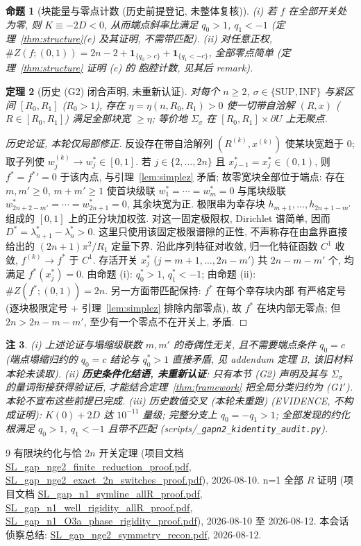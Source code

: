 \documentclass[UTF8]{ctexart}
\newtheorem{theorem}{定理}[section]
\newtheorem{proposition}[theorem]{命题}
\newtheorem{remark}[theorem]{注}
\begin{document}
\begin{proposition}[块能量与零点计数 (历史前提登记, 未整体复核)]
(i) 若 $f$ 在全部开关处为零, 则 $K\equiv-2D<0$, 从而端点斜率比满足
$q_0>1$, $q_1<-1$ (定理~\ref{thm:structure}(e) 及其证明, 不需带匹配).
(ii) 对任意正权, $\#Z(f;(0,1))=2n-2+\mathbf1_{\{q_0>c\}}
+\mathbf1_{\{q_1<-c\}}$, 全部零点简单 (定理~\ref{thm:structure} 证明 (c) 的
胞腔计数, 见其后 remark).
\end{proposition}

\begin{theorem}[历史 (G2) 闭合声明, 未重新认证]\label{thm:g2}
对每个 $n\ge2$, $\sigma\in\{\mathrm{SUP},\mathrm{INF}\}$ 与紧区间
$[R_0,R_1]$ ($R_0>1$), 存在 $\eta=\eta(n,R_0,R_1)>0$ 使一切带自洽解
$(R,x)$ ($R\in[R_0,R_1]$) 满足全部块宽 $\ge\eta$; 等价地 $\Sigma_\sigma$
在 $[R_0,R_1]\times\partial U$ 上无聚点.
\end{theorem}

\begin{proof}[历史论证, 本轮仅局部修正]
反设存在带自洽解列 $(R^{(k)},x^{(k)})$ 使某块宽趋于 $0$; 取子列使
$w_j^{(k)}\to w_j^*\in[0,1]$. 若 $j\in\{2,\dots,2n\}$ 且
$x_{j-1}^*=x_j^*\in(0,1)$, 则 $f^*=f^{*}{}'=0$ 于该内点, 与引理~\ref{lem:simplez}
矛盾; 故零宽块全部位于端点: 存在 $m,m'\ge0$, $m+m'\ge1$ 使首块级联
$w_1^*=\cdots=w_m^*=0$ 与尾块级联 $w_{2n+2-m'}^*=\cdots=w_{2n+1}^*=0$,
其余块宽为正. 极限串为幸存块 $h_{m+1},\dots,h_{2n+1-m'}$ 组成的
$[0,1]$ 上的正分块加权弦. 对这一固定极限权, Dirichlet 谱简单, 因而
$D^*=\lambda_{n+1}^*-\lambda_n^*>0$. 这里只使用该固定极限谱隙的正性,
不声称存在由盒界直接给出的 $(2n+1)\pi^2/R_1$ 定量下界.
沿此序列特征对收敛, 归一化特征函数 $C^1$ 收敛,
$f^{(k)}\to f^*$ 于 $C^1$. 存活开关 $x_j^*$ ($j=m+1,\dots,2n-m'$) 共
$2n-m-m'$ 个, 均满足 $f^*(x_j^*)=0$. 由命题 (i): $q_0^*>1$, $q_1^*<-1$;
由命题 (ii): $\#Z(f^*;(0,1))=2n$. 另一方面带匹配保持: $f^*$ 在每个幸存块内部
有严格定号 (逐块极限定号 + 引理~\ref{lem:simplez} 排除内部零点), 故
$f^*$ 在块内部无零点; 但 $2n>2n-m-m'$, 至少有一个零点不在开关上, 矛盾.
\end{proof}

\begin{remark}
(i) 上述论证与塌缩级联数 $m,m'$ 的奇偶性无关, 且不需要端点条件
$q_0=c$ (端点塌缩归约的 $q_0=c$ 结论与 $q_0^*>1$ 直接矛盾, 见 addendum
定理 B, 该旧材料本轮未读取).
(ii) \textbf{历史条件化结语, 未重新认证}: 只有本节 (G2) 声明及其与
$\Sigma_\sigma$ 的量词衔接获得验证后, 才能结合定理~\ref{thm:framework}
把全局分类归约为 (G1$'$). 本轮不宣布这些前提已完成.
(iii) 历史数值交叉 (本轮未重跑)
(EVIDENCE, 不构成证明): $K(0)+2D$ 达 $10^{-11}$ 量级; 完整分支上
$q_0=-q_1>1$; 全部发现的约化根满足 $q_0>1$, $q_1<-1$ 且带不匹配
(scripts/\texttt{\_gapn2\_kidentity\_audit.py}).
\end{remark}
\begin{thebibliography}{9}
 有限块约化与恰 $2n$ 开关定理 (项目文档
\url{SL_gap_nge2_finite_reduction_proof.pdf}, \url{SL_gap_nge2_exact_2n_switches_proof.pdf}),
2026-08-10.
 n=1 全部 $R$ 证明 (项目文档
\url{SL_gap_n1_symline_allR_proof.pdf}, \url{SL_gap_n1_well_rigidity_allR_proof.pdf},
\url{SL_gap_n1_O3a_phase_rigidity_proof.pdf}), 2026-08-10 至 2026-08-12.
 本会话侦察总结: \url{SL_gap_nge2_symmetry_recon.pdf}, 2026-08-12.
\end{thebibliography}
\end{document}
